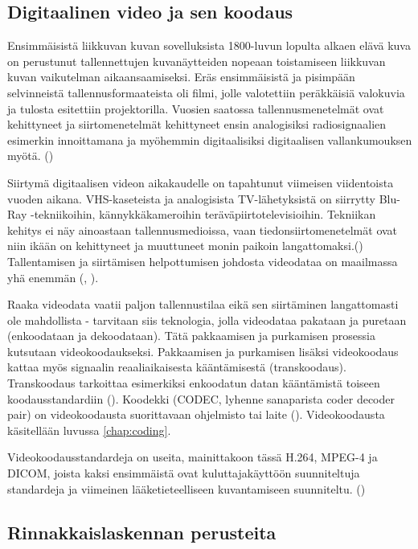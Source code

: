 \subsection{Digitaalinen video ja sen koodaus}

Ensimmäisistä liikkuvan kuvan sovelluksista 1800-luvun lopulta
alkaen elävä kuva on perustunut tallennettujen kuvanäytteiden nopeaan toistamiseen
liikkuvan kuvan vaikutelman aikaansaamiseksi.
Eräs ensimmäisistä ja pisimpään selvinneistä tallennusformaateista oli filmi,
jolle valotettiin peräkkäisiä valokuvia ja tulosta esitettiin projektorilla.
Vuosien saatossa tallennusmenetelmät ovat kehittyneet ja siirtomenetelmät
kehittyneet ensin analogisiksi radiosignaalien esimerkin innoittamana ja
myöhemmin digitaalisiksi digitaalisen vallankumouksen myötä. (\citealt{mitra})

Siirtymä digitaalisen videon aikakaudelle on tapahtunut viimeisen viidentoista
vuoden aikana. VHS-kaseteista ja analogisista TV-lähetyksistä
on siirrytty Blu-Ray -tekniikoihin, kännykkäkameroihin
teräväpiirtotelevisioihin. Tekniikan kehitys ei näy ainoastaan tallennusmedioissa,
vaan tiedonsiirtomenetelmät ovat niin ikään on kehittyneet ja muuttuneet monin paikoin
langattomaksi.(\citealt{h264})
Tallentamisen ja siirtämisen helpottumisen johdosta videodataa on maailmassa
yhä enemmän (\citealt{cisco}, \citealt{youtube}).

Raaka videodata vaatii paljon tallennustilaa eikä sen siirtäminen
langattomasti ole mahdollista - tarvitaan siis teknologia, jolla videodataa pakataan ja puretaan
(enkoodataan ja dekoodataan). Tätä pakkaamisen ja purkamisen prosessia
kutsutaan videokoodaukseksi. Pakkaamisen ja purkamisen lisäksi videokoodaus kattaa
myös signaalin reaaliaikaisesta kääntämisestä (transkoodaus). Transkoodaus
tarkoittaa esimerkiksi enkoodatun datan kääntämistä toiseen koodausstandardiin (\citealt{mpeg_app}).
Koodekki (CODEC, lyhenne sanaparista coder decoder pair) on videokoodausta suorittavaan
ohjelmisto tai laite (\citealt{h264}). Videokoodausta käsitellään luvussa \ref{chap:coding}.

Videokoodausstandardeja on useita, mainittakoon tässä H.264, MPEG-4 ja DICOM,
joista kaksi ensimmäistä ovat kuluttajakäyttöön suunniteltuja standardeja
ja viimeinen lääketieteelliseen kuvantamiseen suunniteltu. (\citealt{h264})

\subsection{Rinnakkaislaskennan perusteita}

